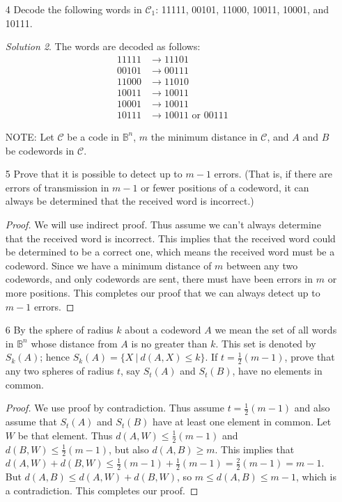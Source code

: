 \documentclass[11pt, b5paper, draft, fleqn]{book}
\theoremstyle{remark}
\newtheorem*{solution}{Solution}
\theoremstyle{plain}
\begin{document}
\begin{enumerate}
\begin{solution}
		\noindent
		The minimum distance is 2.
	\end{solution}
	
	\item[4] Decode the following words in \(\mathcal{C}_1\): 11111, 00101, 11000, 10011, 10001, and 10111.
	\begin{solution}
		The words are decoded as follows:
		\begin{align*}
			11111 & \rightarrow 11101 \\
			00101 & \rightarrow 00111 \\
			11000 & \rightarrow 11010 \\
			10011 & \rightarrow 10011 \\
			10001 & \rightarrow 10011 \\
			10111 & \rightarrow 10011 \text{ or } 00111
		\end{align*}
	\end{solution}
	
	\item[NOTE:] Let \(\mathcal{C}\) be a code in \(\mathbb{B}^n\), \(m\) the minimum distance in \(\mathcal{C}\), and \(A\) and \(B\) be codewords in \(\mathcal{C}\).
	
	\item[5] Prove that it is possible to detect up to \(m-1\) errors. (That is, if there are errors of transmission in \(m-1\) or fewer positions of a codeword, it can always be determined that the received word is incorrect.)
	\begin{proof}
		We will use indirect proof. Thus assume we can't always determine that the received word is incorrect. This implies that the received word could be determined to be a correct one, which means the received word must be a codeword. Since we have a minimum distance of \(m\) between any two codewords, and only codewords are sent, there must have been errors in \(m\) or more positions. This completes our proof that we can always detect up to \(m-1\) errors.
	\end{proof}
	
	\item[6] By the sphere of radius \(k\) about a codeword \(A\) we mean the set of all words in \(\mathbb{B}^n\) whose distance from \(A\) is no greater than \(k\). This set is denoted by \(S_k(A)\); hence \(S_k(A) = \{X \ | \ d(A, X) \leq k\}\). If \(t = \frac{1}{2}(m-1)\), prove that any two spheres of radius \(t\), say \(S_t(A)\) and \(S_t(B)\), have no elements in common.
	\begin{proof}
		We use proof by contradiction. Thus assume \(t = \frac{1}{2}(m-1)\) and also assume that \(S_t(A)\) and \(S_t(B)\) have at least one element in common. Let \(W\) be that element. Thus \(d(A, W) \leq \frac{1}{2}(m-1)\) and \(d(B, W) \leq \frac{1}{2}(m-1)\), but also \(d(A, B) \geq m\). This implies that \(d(A, W) + d(B, W) \leq \frac{1}{2}(m-1) + \frac{1}{2}(m-1) = \frac{2}{2}(m-1) = m-1 \). But \(d(A, B) \leq d(A, W) + d(B, W)\), so \(m \leq d(A, B) \leq m-1\), which is a contradiction. This completes our proof.
	\end{proof}
	

\end{enumerate}
\end{document}

